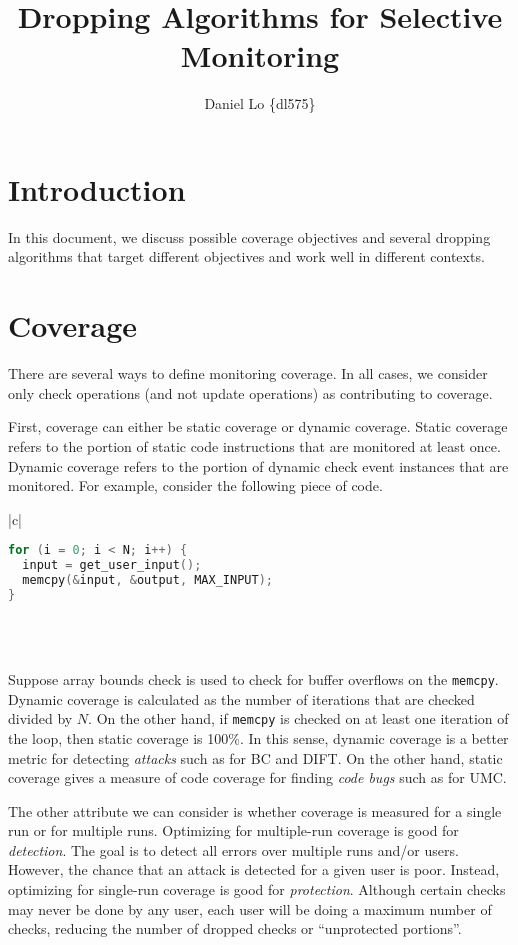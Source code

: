 \documentclass[11pt, letterpaper]{article}
\title{Dropping Algorithms for Selective Monitoring}
\author{Daniel Lo \{dl575\}}
\begin{document}

\section{Introduction}
In this document, we discuss possible coverage objectives and several dropping
algorithms that target different objectives and work well in different
contexts.

\section{Coverage}

There are several ways to define monitoring coverage. In all cases, we consider
only check operations (and not update operations) as contributing to coverage.

First, coverage can either be static coverage or dynamic coverage. Static
coverage refers to the portion of static code instructions that are monitored
at least once. Dynamic coverage refers to the portion of dynamic check event
instances that are monitored. For example, consider the following piece of code.

\begin{center}
\begin{tabular}{|c|}
\hline
\\
\begin{lstlisting}[language=c]
for (i = 0; i < N; i++) {
  input = get_user_input();
  memcpy(&input, &output, MAX_INPUT);
}
\end{lstlisting}
\\\\ \hline
\end{tabular}
\end{center}

Suppose array bounds check is used to check for buffer overflows on the {\tt memcpy}.
Dynamic coverage is calculated as the number of iterations that are checked
divided by $N$. On the other hand, if {\tt memcpy} is checked on at least one
iteration of the loop, then static coverage is 100\%. In this sense, dynamic
coverage is a better metric for detecting \emph{attacks} such as for BC and
DIFT. On the other hand, static coverage gives a measure of code coverage for
finding \emph{code bugs} such as for UMC.

The other attribute we can consider is whether coverage is measured for a
single run or for multiple runs. Optimizing for multiple-run coverage is good
for \emph{detection}. The goal is to detect all errors over multiple runs
and/or users. However, the chance that an attack is detected for a given user
is poor. Instead, optimizing for single-run coverage is good for
\emph{protection}. Although certain checks may never be done by any user, each
user will be doing a maximum number of checks, reducing the number of dropped
checks or ``unprotected portions''.
\end{document}
